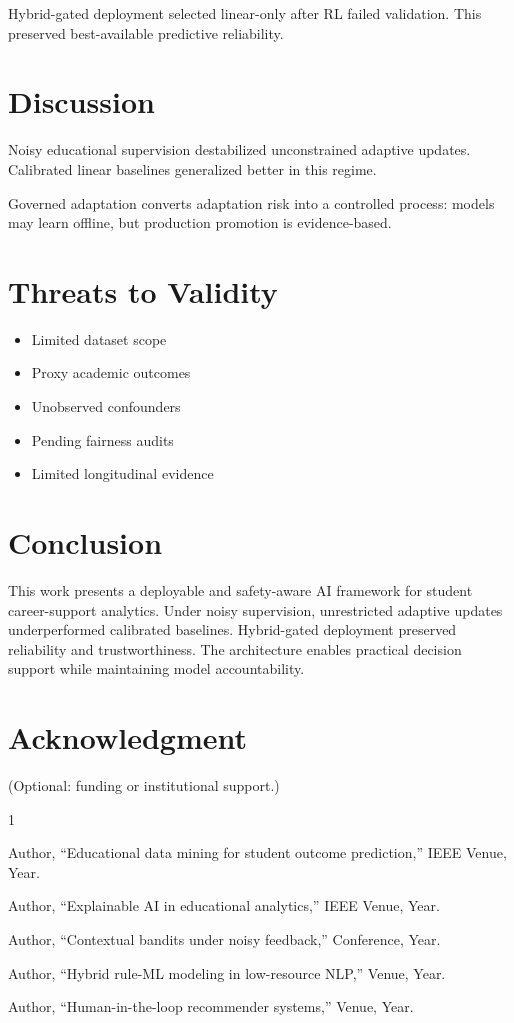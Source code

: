\documentclass[conference]{IEEEtran}
\begin{document}
Hybrid-gated deployment selected linear-only after RL failed validation. This preserved best-available predictive reliability.

\section{Discussion}

Noisy educational supervision destabilized unconstrained adaptive updates. Calibrated linear baselines generalized better in this regime.

Governed adaptation converts adaptation risk into a controlled process: models may learn offline, but production promotion is evidence-based.

\section{Threats to Validity}

\begin{itemize}
\item Limited dataset scope
\item Proxy academic outcomes
\item Unobserved confounders
\item Pending fairness audits
\item Limited longitudinal evidence
\end{itemize}

\section{Conclusion}

This work presents a deployable and safety-aware AI framework for student career-support analytics. Under noisy supervision, unrestricted adaptive updates underperformed calibrated baselines. Hybrid-gated deployment preserved reliability and trustworthiness. The architecture enables practical decision support while maintaining model accountability.

\section*{Acknowledgment}

(Optional: funding or institutional support.)


\begin{thebibliography}{1}

Author, ``Educational data mining for student outcome prediction,'' IEEE Venue, Year.

Author, ``Explainable AI in educational analytics,'' IEEE Venue, Year.

Author, ``Contextual bandits under noisy feedback,'' Conference, Year.

Author, ``Hybrid rule-ML modeling in low-resource NLP,'' Venue, Year.

Author, ``Human-in-the-loop recommender systems,'' Venue, Year.

\end{thebibliography}
\end{document}
